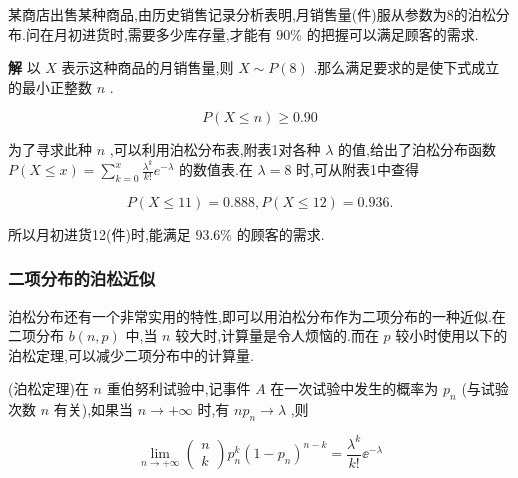 \begin{example}
	某商店出售某种商品,由历史销售记录分析表明,月销售量(件)服从参数为8的泊松分布.问在月初进货时,需要多少库存量,才能有 $ 90\% $ 的把握可以满足顾客的需求.
	
	\textbf{解}
	以 $ X $ 表示这种商品的月销售量,则 $ X \sim P(8) $ .那么满足要求的是使下式成立的最小正整数 $ n $ .
	
	\[
	P(X \leqslant n) \geqslant 0.90
	\]
	
	为了寻求此种 $ n $ ,可以利用泊松分布表,附表1对各种 $ \lambda $ 的值,给出了泊松分布函数 $ P(X \leqslant x)=\sum_{k=0}^{x} \frac{\lambda^{k}}{k !} e^{-\lambda} $ 的数值表.在 $ \lambda=8 $ 时,可从附表1中查得
	
	\[
	P(X \leqslant 11)=0.888, P(X \leqslant 12)=0.936 .
	\]
	
	所以月初进货12(件)时,能满足 $ 93.6\% $ 的顾客的需求.
\end{example}

\subsubsection{二项分布的泊松近似}

泊松分布还有一个非常实用的特性,即可以用泊松分布作为二项分布的一种近似.在二项分布 $ b(n,p) $ 中,当 $ n $ 较大时,计算量是令人烦恼的.而在 $ p $ 较小时使用以下的泊松定理,可以减少二项分布中的计算量.

\begin{theorem}
	(泊松定理)在 $ n $ 重伯努利试验中,记事件 $ A $ 在一次试验中发生的概率为 $ p_{n} $ (与试验次数 $ n $ 有关),如果当 $ n \rightarrow+\infty $ 时,有 $ n p_{n} \rightarrow \lambda $ ,则
	
	\begin{equation}
	\lim _{n \rightarrow+\infty} \left( \begin{array}{l}{n} \\ {k}\end{array}\right) p_{n}^{k}\left(1-p_{n}\right)^{n-k}=\frac{\lambda^{k}}{k !} \ee ^{-\lambda} \label{eq:2.4.4}
	\end{equation}
	
\end{theorem}

